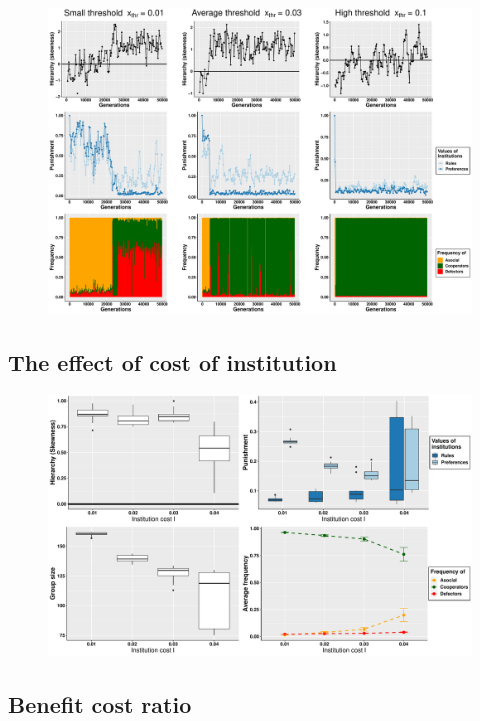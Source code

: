 \documentclass{rstb}
\begin{document}
\begin{linenumbers}
\begin{figure}
    \centering
    \includegraphics[width=0.8\linewidth]{Figures/pt_gen_xThr.pdf}
    \caption{}
    \label{figGen_xThr}
\end{figure}




\subsection*{The effect of cost of institution}

\begin{figure}
    \centering
    \includegraphics[width=0.8\linewidth]{Figures/pt_instCost.pdf}
    \caption{}
    \label{figI}
\end{figure}

\subsection*{Benefit cost ratio}


\end{linenumbers}
\end{document}
